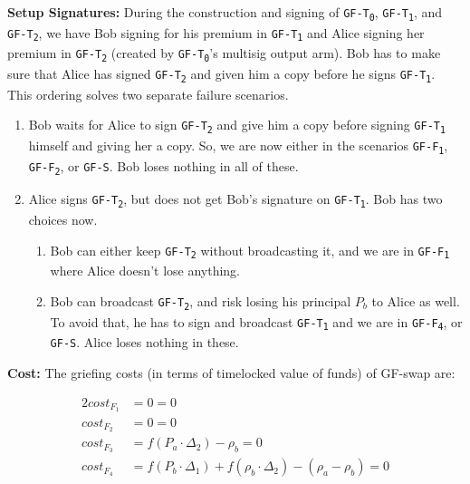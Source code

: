 \bigbreak
\noindent
\textbf{Setup Signatures:} 
During the construction and signing of \texttt{GF-T\textsubscript{0}}, \texttt{GF-T\textsubscript{1}}, and \texttt{GF-T\textsubscript{2}}, we have Bob signing for his premium in \texttt{GF-T\textsubscript{1}} and Alice signing her premium in \texttt{GF-T\textsubscript{2}} (created by \texttt{GF-T\textsubscript{0}}'s multisig output arm). Bob has to make sure that Alice has signed \texttt{GF-T\textsubscript{2}} and given him a copy before he signs \texttt{GF-T\textsubscript{1}}. This ordering solves two separate failure scenarios. 
\begin{enumerate}
    \item Bob waits for Alice to sign \texttt{GF-T\textsubscript{2}} and give him a copy before signing \texttt{GF-T\textsubscript{1}} himself and giving her a copy. So, we are now either in the scenarios \texttt{GF-F\textsubscript{1}}, \texttt{GF-F\textsubscript{2}}, or \texttt{GF-S}. Bob loses nothing in all of these.
    \item Alice signs \texttt{GF-T\textsubscript{2}}, but does not get Bob's signature on \texttt{GF-T\textsubscript{1}}. Bob has two choices now. 
    \begin{enumerate}
        \item Bob can either keep \texttt{GF-T\textsubscript{2}} without broadcasting it, and we are in \texttt{GF-F\textsubscript{1}} where Alice doesn't lose anything.
        \item Bob can broadcast \texttt{GF-T\textsubscript{2}}, and risk losing his principal $P_b$ to Alice as well. To avoid that, he has to sign and broadcast \texttt{GF-T\textsubscript{1}} and we are in \texttt{GF-F\textsubscript{4}}, or \texttt{GF-S}. Alice loses nothing in these.
    \end{enumerate}
\end{enumerate}

\bigbreak
\noindent
\textbf{Cost:} 
The griefing costs (in terms of timelocked value of funds) of GF-swap are:

\begin{alignat}{2}
    cost_{F_1} &= 0 \label{eq:gf_cost_1} = 0\\
    cost_{F_2} &= 0 \label{eq:gf_cost_2} = 0\\
    cost_{F_3} &= f(P_a\cdot\Delta_2) - \rho_b = 0 \label{eq:gf_cost_3}\\
    cost_{F_4} &= f(P_b\cdot\Delta_1) + f(\rho_b\cdot\Delta_2) - (\rho_a - \rho_b) = 0 \label{eq:gf_cost_4}
\end{alignat}

